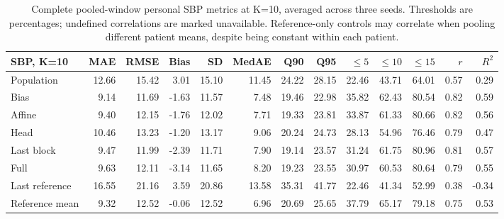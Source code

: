 \documentclass[11pt]{article}
\begin{document}
\begin{table}[t]\centering\scriptsize\setlength{\tabcolsep}{3pt}
\begin{tabular}{lrrrrrrrrrrrr}\toprule
SBP, K=10 & MAE & RMSE & Bias & SD & MedAE & Q90 & Q95 & $\leq5$ & $\leq10$ & $\leq15$ & $r$ & $R^2$\\\midrule
Population & 12.66 & 15.42 & 3.01 & 15.10 & 11.45 & 24.22 & 28.15 & 22.46 & 43.71 & 64.01 & 0.57 & 0.29\\
Bias & 9.14 & 11.69 & -1.63 & 11.57 & 7.48 & 19.46 & 22.98 & 35.82 & 62.43 & 80.54 & 0.82 & 0.59\\
Affine & 9.40 & 12.15 & -1.76 & 12.02 & 7.71 & 19.33 & 23.81 & 33.87 & 61.33 & 80.66 & 0.82 & 0.56\\
Head & 10.46 & 13.23 & -1.20 & 13.17 & 9.06 & 20.24 & 24.73 & 28.13 & 54.96 & 76.46 & 0.79 & 0.47\\
Last block & 9.47 & 11.99 & -2.39 & 11.71 & 7.90 & 19.14 & 23.57 & 31.24 & 61.75 & 80.96 & 0.81 & 0.57\\
Full & 9.63 & 12.11 & -3.14 & 11.65 & 8.20 & 19.23 & 23.55 & 30.97 & 60.53 & 80.64 & 0.79 & 0.55\\
Last reference & 16.55 & 21.16 & 3.59 & 20.86 & 13.58 & 35.31 & 41.77 & 22.46 & 41.34 & 52.99 & 0.38 & -0.34\\
Reference mean & 9.32 & 12.52 & -0.06 & 12.52 & 6.96 & 20.69 & 25.65 & 37.79 & 65.17 & 79.18 & 0.75 & 0.53\\
\bottomrule\end{tabular}
\caption{Complete pooled-window personal SBP metrics at K=10, averaged across three seeds. Thresholds are percentages; undefined correlations are marked unavailable. Reference-only controls may correlate when pooling different patient means, despite being constant within each patient.}\end{table}
\end{document}
